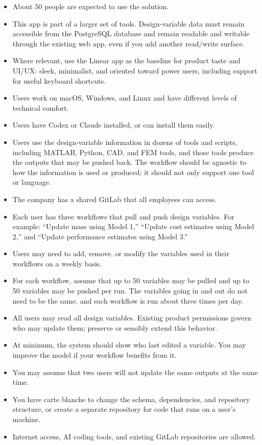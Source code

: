 \documentclass[10pt,a4paper]{article}
\begin{document}
\begin{itemize}
  \item About 50 people are expected to use the solution.
  \item This app is part of a larger set of tools. Design-variable data must remain accessible from the PostgreSQL database and remain readable and writable through the existing web app, even if you add another read/write surface.
  \item Where relevant, use the Linear app as the baseline for product taste and UI/UX: sleek, minimalist, and oriented toward power users, including support for useful keyboard shortcuts.
  \item Users work on macOS, Windows, and Linux and have different levels of technical comfort.
  \item Users have Codex or Claude installed, or can install them easily.
  \item Users use the design-variable information in dozens of tools and scripts, including MATLAB, Python, CAD, and FEM tools, and those tools produce the outputs that may be pushed back. The workflow should be agnostic to how the information is used or produced; it should not only support one tool or language.
  \item The company has a shared GitLab that all employees can access.
  \item Each user has three workflows that pull and push design variables. For example: “Update mass using Model 1,” “Update cost estimates using Model 2,” and “Update performance estimates using Model 3.”
  \item Users may need to add, remove, or modify the variables used in their workflows on a weekly basis.
  \item For each workflow, assume that up to 50 variables may be pulled and up to 50 variables may be pushed per run. The variables going in and out do not need to be the same, and each workflow is run about three times per day.
  \item All users may read all design variables. Existing product permissions govern who may update them; preserve or sensibly extend this behavior.
  \item At minimum, the system should show who last edited a variable. You may improve the model if your workflow benefits from it.
  \item You may assume that two users will not update the same outputs at the same time.
  \item You have carte blanche to change the schema, dependencies, and repository structure, or create a separate repository for code that runs on a user's machine.
  \item Internet access, AI coding tools, and existing GitLab repositories are allowed.
\end{itemize}
\end{document}
